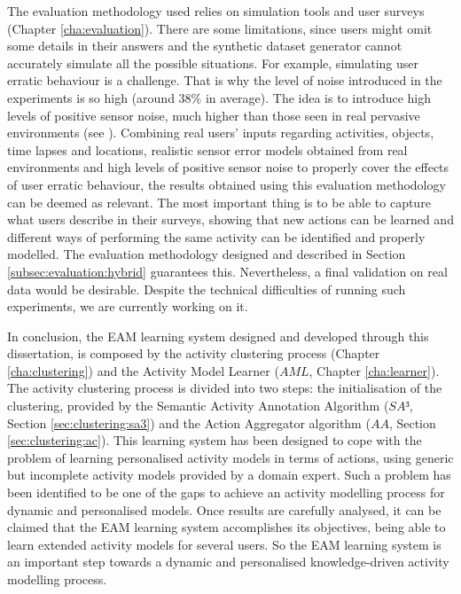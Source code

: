 The evaluation methodology used relies on simulation tools and user surveys (Chapter \ref{cha:evaluation}). There are some limitations, since users might omit some details in their answers and the synthetic dataset generator cannot accurately simulate all the possible situations. For example, simulating user erratic behaviour is a challenge. That is why the level of noise introduced in the experiments is so high (around 38\% in average). The idea is to introduce high levels of positive sensor noise, much higher than those seen in real pervasive environments (see \cite{Chen2012}). Combining real users' inputs regarding activities, objects, time lapses and locations, realistic sensor error models obtained from real environments and high levels of positive sensor noise to properly cover the effects of user erratic behaviour, the results obtained using this evaluation methodology can be deemed as relevant. The most important thing is to be able to capture what users describe in their surveys, showing that new actions can be learned and different ways of performing the same activity can be identified and properly modelled. The evaluation methodology designed and described in Section \ref{subsec:evaluation:hybrid} guarantees this. Nevertheless, a final validation on real data would be desirable. Despite the technical difficulties of running such experiments, we are currently working on it.

In conclusion, the EAM learning system designed and developed through this dissertation, is composed by the activity clustering process (Chapter \ref{cha:clustering}) and the Activity Model Learner ($AML$, Chapter \ref{cha:learner}). The activity clustering process is divided into two steps: the initialisation of the clustering, provided by the Semantic Activity Annotation Algorithm ($SA³$, Section \ref{sec:clustering:sa3}) and the Action Aggregator algorithm ($AA$, Section \ref{sec:clustering:ac}). This learning system has been designed to cope with the problem of learning personalised activity models in terms of actions, using generic but incomplete activity models provided by a domain expert. Such a problem has been identified to be one of the gaps to achieve an activity modelling process for dynamic and personalised models. Once results are carefully analysed, it can be claimed that the EAM learning system accomplishes its objectives, being able to learn extended activity models for several users. So the EAM learning system is an important step towards a dynamic and personalised knowledge-driven activity modelling process. 
